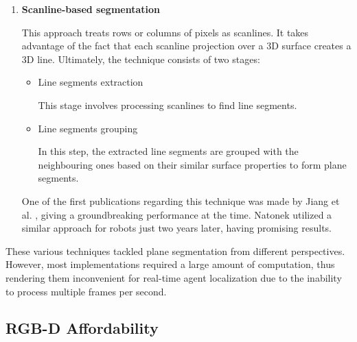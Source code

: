 \begin{enumerate}
\item \textbf{Scanline-based segmentation}

This approach treats rows or columns of pixels as scanlines.
It takes advantage of the fact that each scanline projection over a 3D surface creates a 3D line.
Ultimately, the technique consists of two stages:

\begin{itemize}

\item Line segments extraction

This stage involves processing scanlines to find line segments.

\item Line segments grouping

In this step, the extracted line segments are grouped with the neighbouring ones based on their similar surface properties
to form plane segments.

\end{itemize}

One of the first publications regarding this technique was made by Jiang et al. \cite{JiangOneOfTheFirstScanlineStrategies},
giving a groundbreaking performance at the time.
Natonek \cite{inproceedingsNatonekScanlinesForRobots} utilized a similar approach for robots just two years later, having promising results.

\end{enumerate}

These various techniques tackled plane segmentation from different perspectives.
However, most implementations required a large amount of computation,
thus rendering them inconvenient for real-time agent localization
due to the inability to process multiple frames per second.

\subsection{RGB-D Affordability}

